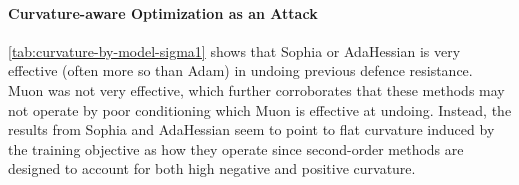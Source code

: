 \documentclass{article}
\theoremstyle{plain}
\theoremstyle{definition}
\theoremstyle{remark}
\begin{document}
\paragraph{Curvature-aware Optimization as an Attack} \cref{tab:curvature-by-model-sigma1} shows that Sophia or AdaHessian is very effective (often more so than Adam) in undoing previous defence resistance. Muon was not very effective, which further corroborates that these methods may not operate by poor conditioning which Muon is effective at undoing. Instead, the results from Sophia and AdaHessian seem to point to flat curvature induced by the training objective as how they operate since second-order methods are designed to account for both high negative and positive curvature.

\begin{table}[htbp]
\caption{Curvature-aware optimizer attacks on defended models ($\alpha=1$). 
Entries report training steps to reach target metric (mean $\pm$ std across seeds). 
$^\dagger$: some seeds diverged; $^\ddagger$: all seeds diverged. Unlike with SpecDef, these attacks are often much more successful on defences that were previously able to resist Adam.}
\label{tab:curvature-by-model-sigma1}
\centering
\setlength{\tabcolsep}{3pt}
\begin{sc}
\end{sc}
\end{table}
\end{document}
